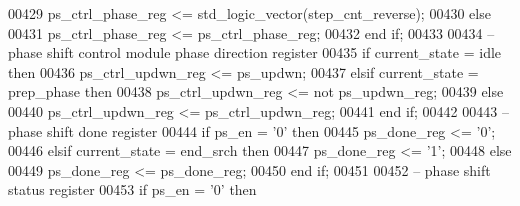 \begin{DoxyCode}
00429          \textcolor{vhdlchar}{ps_ctrl_phase_reg} \textcolor{vhdlchar}{<=} \textcolor{comment}{std\_logic\_vector}\textcolor{vhdlchar}{(}\textcolor{vhdlchar}{step_cnt_reverse}\textcolor{vhdlchar}{)};
00430       \textcolor{keywordflow}{else} 
00431          \textcolor{vhdlchar}{ps_ctrl_phase_reg} \textcolor{vhdlchar}{<=} \textcolor{vhdlchar}{ps_ctrl_phase_reg};
00432       \textcolor{keywordflow}{end} \textcolor{keywordflow}{if};
00433       
00434 \textcolor{keyword}{      -- phase shift control module phase direction register}
00435       \textcolor{keywordflow}{if} \textcolor{vhdlchar}{current_state} \textcolor{vhdlchar}{=} \textcolor{vhdlchar}{idle} \textcolor{keywordflow}{then} 
00436          \textcolor{vhdlchar}{ps_ctrl_updwn_reg} \textcolor{vhdlchar}{<=} \textcolor{vhdlchar}{ps_updwn};
00437       \textcolor{keywordflow}{elsif} \textcolor{vhdlchar}{current_state} \textcolor{vhdlchar}{=} \textcolor{vhdlchar}{prep\_phase} \textcolor{keywordflow}{then} 
00438          \textcolor{vhdlchar}{ps_ctrl_updwn_reg} \textcolor{vhdlchar}{<=} \textcolor{keywordflow}{not} \textcolor{vhdlchar}{ps_updwn_reg};
00439       \textcolor{keywordflow}{else} 
00440          \textcolor{vhdlchar}{ps_ctrl_updwn_reg} \textcolor{vhdlchar}{<=} \textcolor{vhdlchar}{ps_ctrl_updwn_reg};
00441       \textcolor{keywordflow}{end} \textcolor{keywordflow}{if};
00442           
00443 \textcolor{keyword}{      -- phase shift done register}
00444       \textcolor{keywordflow}{if} \textcolor{vhdlchar}{ps_en} \textcolor{vhdlchar}{=} \textcolor{vhdlchar}{'}\textcolor{vhdllogic}{}\textcolor{vhdllogic}{0}\textcolor{vhdlchar}{'} \textcolor{keywordflow}{then}
00445          \textcolor{vhdlchar}{ps_done_reg} \textcolor{vhdlchar}{<=} \textcolor{vhdlchar}{'}\textcolor{vhdllogic}{}\textcolor{vhdllogic}{0}\textcolor{vhdlchar}{'};
00446       \textcolor{keywordflow}{elsif} \textcolor{vhdlchar}{current_state} \textcolor{vhdlchar}{=} \textcolor{vhdlchar}{end\_srch} \textcolor{keywordflow}{then} 
00447          \textcolor{vhdlchar}{ps_done_reg} \textcolor{vhdlchar}{<=} \textcolor{vhdlchar}{'}\textcolor{vhdllogic}{}\textcolor{vhdllogic}{1}\textcolor{vhdlchar}{'};
00448       \textcolor{keywordflow}{else} 
00449          \textcolor{vhdlchar}{ps_done_reg} \textcolor{vhdlchar}{<=} \textcolor{vhdlchar}{ps_done_reg};
00450       \textcolor{keywordflow}{end} \textcolor{keywordflow}{if};
00451       
00452 \textcolor{keyword}{      -- phase shift status register}
00453       \textcolor{keywordflow}{if} \textcolor{vhdlchar}{ps_en} \textcolor{vhdlchar}{=} \textcolor{vhdlchar}{'}\textcolor{vhdllogic}{}\textcolor{vhdllogic}{0}\textcolor{vhdlchar}{'} \textcolor{keywordflow}{then}

\end{DoxyCode}
